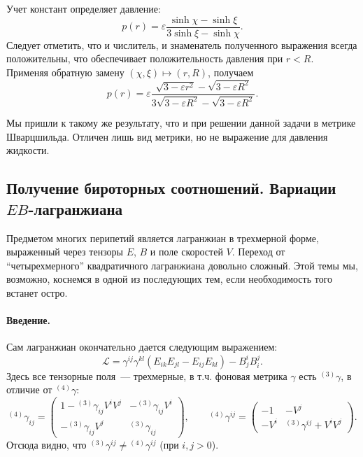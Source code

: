 \documentclass[\docroot/reports/draft/report.tex]{subfiles}
\begin{document}
    Учет констант определяет давление:
    \begin{equation*}
        p(r) = \varepsilon \frac{\sinh\chi - \sinh\xi}{3\sinh\xi - \sinh\chi} .
    \end{equation*}
    Следует отметить, что и числитель, и знаменатель полученного выражения всегда положительны, что обеспечивает положительность давления при $r < R$. Применяя обратную замену $(\chi,\xi) \mapsto (r,R)$, получаем
    \begin{equation*}
        p(r) = \varepsilon \frac{\sqrt{3 - \varepsilon r^2} - \sqrt{3 - \varepsilon R^2}}{3 \sqrt{3 - \varepsilon R^2} - \sqrt{3 - \varepsilon R^2}} .
    \end{equation*}

    Мы пришли к такому же результату, что и при решении данной задачи в метрике Шварцшильда. Отличен лишь вид метрики, но не выражение для давления жидкости.

\subsection{Получение бироторных соотношений. Вариации $EB$-лагранжиана}

    Предметом многих перипетий является лагранжиан в трехмерной форме, выраженный через тензоры $E$, $B$ и поле скоростей $V$. Переход от \enquote{четырехмерного} квадратичного лагранжиана довольно сложный. Этой темы мы, возможно, коснемся в одной из последующих тем, если необходимость того встанет остро.

    \paragraph{Введение.}

    Сам лагранжиан окончательно дается следующим выражением:
    \begin{equation}
        \mathcal{L} = \gamma^{ij}\gamma^{kl} (E_{ik}E_{jl} - E_{ij}E_{kl}) - B^i_j B_i^j .
    \end{equation}
    Здесь все тензорные поля~--- трехмерные, в т.ч. фоновая метрика $\gamma$ есть ${}^{(3)}\gamma$, в отличие от ${}^{(4)}\gamma$:
    \begin{equation}
        {}^{(4)}\gamma_{ij} = \begin{pmatrix}
            1 - {}^{(3)}\gamma_{ij} V^i V^j   & - {}^{(3)}\gamma_{ij} V^i \\
            - {}^{(3)}\gamma_{ij} V^j         & {}^{(3)}\gamma_{ij}
        \end{pmatrix} , \qquad
        {}^{(4)}\gamma^{ij} = \begin{pmatrix}
            - 1   & - V^j                           \\
            - V^i & {}^{(3)}\gamma^{ij} + V^i V^j
        \end{pmatrix} .
    \end{equation}
    Отсюда видно, что ${}^{(3)}\gamma^{ij} \neq {}^{(4)}\gamma^{ij}$ (при $i,j > 0$).
\end{document}
